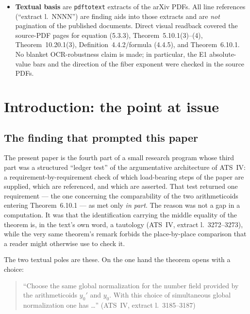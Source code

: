 \documentclass[11pt,a4paper]{article}
\theoremstyle{definition}
\theoremstyle{plain}
\theoremstyle{definition}
\newcommand{\anchor}[2]{(#1, extract l.~#2)}
\begin{document}
\begin{center}
{{\begin{itemize}
  not a claim that it is unresolvable, and not an error claim.
\item \textbf{Textual basis} are \texttt{pdftotext} extracts of the arXiv PDFs.
  All line references (``extract l.~NNNN'') are finding aids into those extracts
  and are \emph{not} pagination of the published documents. Direct visual
  readback covered the source-PDF pages for equation (5.3.3),
  Theorem~5.10.1(3)--(4), Theorem~10.20.1(3),
  Definition~4.4.2/formula (4.4.5), and Theorem~6.10.1. No blanket
  OCR-robustness claim is made; in particular, the E1 absolute-value bars and the
  direction of the fiber exponent were checked in the source PDFs.
\end{itemize}
\medskip
}}
\end{center}

\clearpage
\tableofcontents
\clearpage

\section{Introduction: the point at issue}

\subsection{The finding that prompted this paper}

The present paper is the fourth part of a small research program whose third
part was a structured ``ledger test'' of the argumentative architecture of ATS~IV:
a requirement-by-requirement check of which load-bearing steps of the paper are
supplied, which are referenced, and which are asserted. That test returned one
requirement --- the one concerning the comparability of the two arithmeticoids
entering Theorem~6.10.1 --- as met only \emph{in part}. The reason was not a gap
in a computation. It was that the identification carrying the middle equality of
the theorem is, in the text's own word, a tautology
\anchor{ATS~IV}{3272--3273}, while the very same theorem's remark forbids the
place-by-place comparison that a reader might otherwise use to check it.

The two textual poles are these. On the one hand the theorem opens with a choice:

\begin{quote}\small
``Choose the same global normalization for the number field provided by the
arithmeticoids $y_0'$ and $y_0$. With this choice of simultaneous global
normalization one has \ldots'' \hfill\anchor{ATS~IV}{3185--3187}
\end{quote}
\end{document}
